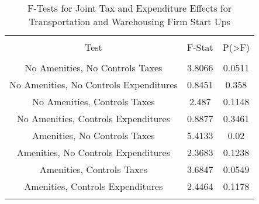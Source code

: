 
\begin{table}[!htbp] \centering 
  \caption{F-Tests for Joint Tax and Expenditure Effects for Transportation and Warehousing Firm Start Ups} 
  \label{48-49Ftests} 
\begin{tabular}{@{\extracolsep{5pt}} ccc} 
\\[-1.8ex]\hline 
\hline \\[-1.8ex] 
Test & F-Stat & P(\textgreater F) \\ 
\hline \\[-1.8ex] 
No Amenities, No Controls Taxes & 3.8066 & 0.0511 \\ 
No Amenities, No Controls Expenditures & 0.8451 & 0.358 \\ 
No Amenities, Controls Taxes & 2.487 & 0.1148 \\ 
No Amenities, Controls Expenditures & 0.8877 & 0.3461 \\ 
Amenities, No Controls Taxes & 5.4133 & 0.02 \\ 
Amenities, No Controls Expenditures & 2.3683 & 0.1238 \\ 
Amenities, Controls Taxes & 3.6847 & 0.0549 \\ 
Amenities, Controls Expenditures & 2.4464 & 0.1178 \\ 
\hline \\[-1.8ex] 
\end{tabular} 
\end{table} 

